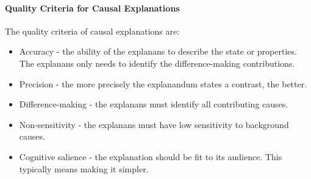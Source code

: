 \paragraph{Quality Criteria for Causal Explanations}
The quality criteria of causal explanations are:
\begin{itemize}
	\item Accuracy - the ability of the explanans to describe the state or properties. The explanans only needs to identify the difference-making contributions.
	\item Precision - the more precisely the explanandum states a contrast, the better.
	\item Difference-making - the explanans must identify all contributing causes.
	\item Non-sensitivity - the explanans must have low sensitivity to background causes.
	\item Cognitive salience - the explanation should be fit to its audience. This typically means making it simpler.
\end{itemize}